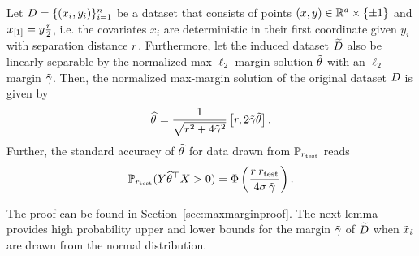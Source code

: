 \begin{lemma}
\label{lem:maxmargin}
Let $D = \{(x_i,y_i)\}_{i=1}^{n}$ be a dataset that
consists of points $(x,y) \in \mathbb{R}^{d}\times\{\pm 1\}$ and
$x_{[1]} = y\frac{r}{2}$, i.e. the covariates $x_i$ are
deterministic in their first coordinate given $y_i$ with
separation distance $r$. Furthermore, let the induced dataset
$\widetilde{D}$ also be linearly separable by the normalized
max-$\ell_2$-margin solution $\tilde{\theta}$ with an $\ell_2$-margin 
$\tilde{\gamma}$. Then, the normalized max-margin solution of the
original dataset $D$ is given by
\begin{equation}
\label{eq:lemmaxmargin}
\widehat{\theta}^{} = \frac{1}{\sqrt{r^2 + 4 \tilde{\gamma}^{2}}}\left[r,  2 \tilde{\gamma} \tilde{\theta} \right].
\end{equation}
Further, the standard accuracy of $\widehat{\theta}^{}$ for data drawn from $\mathbb{P}_{r_{\text{test}}}$ reads
\begin{equation}
  \label{eq:stdaccmaxmargin}
  \mathbb{P}_{r_{\text{test}}}(Y \widehat{\theta}^{\top} X > 0) = \Phi\left(
  \frac{r \:r_{\text{test}} }{4\sigma\: \tilde{\gamma}} \right).
\end{equation}
\end{lemma}
The proof can be found in Section~\ref{sec:maxmarginproof}. The next lemma provides high probability upper and lower bounds
for the margin $\tilde{\gamma}$ of $\widetilde{D}$ when $\tilde{x}_i$ are drawn from the normal distribution.
